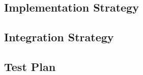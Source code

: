 \subsection{Implementation Strategy}
\label{sect:Implementation:implementation}


\subsection{Integration Strategy}
\label{sect:Implementation:integration}


\subsection{Test Plan}
\label{sect:Implementation:test}
